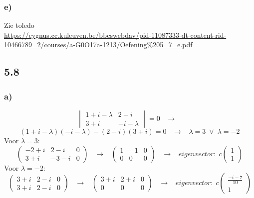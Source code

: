 \documentclass[11pt]{article}
\begin{document}
\subsubsection*{e)}
Zie toledo\\
\url{https://cygnus.cc.kuleuven.be/bbcswebdav/pid-11087333-dt-content-rid-10466789_2/courses/a-G0O17a-1213/Oefening%205_7_e.pdf}

\subsection*{5.8}
\subsubsection*{a)}
\[
\begin{vmatrix}
1+i-\lambda & 2-i \\
3+i & -i-\lambda
\end{vmatrix}
=0
\;\;\;\longrightarrow\;\;\;
\]
\[
(1+i-\lambda)(-i-\lambda)-(2-i)(3+i)=0
\;\;\;\longrightarrow\;\;\;
\lambda = 3 \;\vee\; \lambda = -2
\]
Voor $\lambda = 3$: 
\[
\left(
\begin{array}{cc|c}
-2+i & 2-i & 0 \\
3+i & -3-i & 0
\end{array}
\right)
\;\;\;\longrightarrow\;\;\;
\left(
\begin{array}{cc|c}
1 & -1 & 0 \\
0 & 0 & 0
\end{array}
\right)
\;\;\;\longrightarrow\;\;\;
eigenvector:\;
c
\begin{pmatrix}
1\\1
\end{pmatrix}
\]
Voor $\lambda = -2$: 
\[
\left(
\begin{array}{cc|c}
3+i & 2-i & 0 \\
3+i & 2-i & 0
\end{array}
\right)
\;\;\;\longrightarrow\;\;\;
\left(
\begin{array}{cc|c}
3+i & 2+i & 0 \\
0 & 0 & 0
\end{array}
\right)
\;\;\;\longrightarrow\;\;\;
eigenvector:\;
c
\begin{pmatrix}
\frac{-i-7}{10}\\1
\end{pmatrix}
\]
\end{document}
